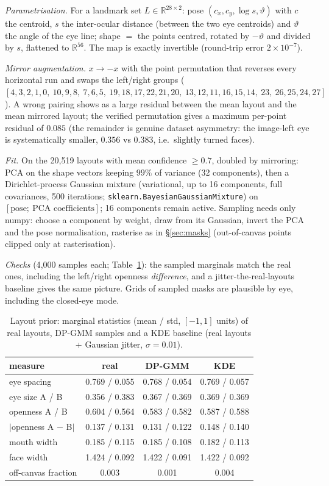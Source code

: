 \documentclass[11pt]{article}
\newcommand{\Rb}{\mathbb{R}}
\begin{document}
\emph{Parametrisation.} For a landmark set $L\in\Rb^{28\times2}$: pose
$(c_x,c_y,\log s,\vartheta)$ with $c$ the centroid, $s$ the inter-ocular distance
(between the two eye centroids) and $\vartheta$ the angle of the eye line; shape $=$
the points centred, rotated by $-\vartheta$ and divided by $s$, flattened to $\Rb^{56}$.
The map is exactly invertible (round-trip error $2\times10^{-7}$).

\emph{Mirror augmentation.} $x\to-x$ with the point permutation that reverses every
horizontal run and swaps the left/right groups
($[4,3,2,1,0,\ 10,9,8,\ 7,6,5,\ 19,18,17,22,21,20,\ 13,12,11,16,15,14,\ 23,\ 26,25,24,27]$).
A wrong pairing shows as a large residual between the mean layout and the mean mirrored
layout; the verified permutation gives a maximum per-point residual of $0.085$ (the
remainder is genuine dataset asymmetry: the image-left eye is systematically smaller,
$0.356$ vs $0.383$, i.e.\ slightly turned faces).

\emph{Fit.} On the 20{,}519 layouts with mean confidence $\ge0.7$, doubled by mirroring:
PCA on the shape vectors keeping $99\%$ of variance (32 components), then a
Dirichlet-process Gaussian mixture (variational, up to 16 components, full covariances,
500 iterations; \texttt{sklearn.BayesianGaussianMixture}) on $[\text{pose};\ \text{PCA
coefficients}]$; 16 components remain active. Sampling needs only numpy: choose a
component by weight, draw from its Gaussian, invert the PCA and the pose normalisation,
rasterise as in \S\ref{sec:masks} (out-of-canvas points clipped only at rasterisation).

\emph{Checks} (4{,}000 samples each; Table~\ref{tab:prior}): the sampled marginals match
the real ones, including the left/right openness \emph{difference}, and a
jitter-the-real-layouts baseline gives the same picture. Grids of sampled masks are
plausible by eye, including the closed-eye mode.

\begin{table}[t]
\centering\small
\caption{Layout prior: marginal statistics (mean / std, $[-1,1]$ units) of real
layouts, DP-GMM samples and a KDE baseline (real layouts + Gaussian jitter,
$\sigma=0.01$).}
\label{tab:prior}
\begin{tabular}{lccc}
\toprule
measure & real & DP-GMM & KDE \\
\midrule
eye spacing & 0.769 / 0.055 & 0.768 / 0.054 & 0.769 / 0.057 \\
eye size A / B & 0.356 / 0.383 & 0.367 / 0.369 & 0.369 / 0.369 \\
openness A / B & 0.604 / 0.564 & 0.583 / 0.582 & 0.587 / 0.588 \\
$|$openness A $-$ B$|$ & 0.137 / 0.131 & 0.131 / 0.122 & 0.148 / 0.140 \\
mouth width & 0.185 / 0.115 & 0.185 / 0.108 & 0.182 / 0.113 \\
face width & 1.424 / 0.092 & 1.422 / 0.091 & 1.422 / 0.092 \\
off-canvas fraction & 0.003 & 0.001 & 0.004 \\
\bottomrule
\end{tabular}
\end{table}
\end{document}
